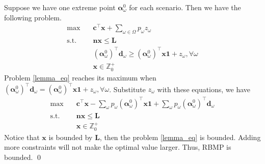   \begin{pf}
    Suppose we have one extreme point $\bm{\alpha}_{\omega}^{0}$ for each scenario. Then we have the following problem.
    \begin{equation}\label{lemma_eq}
      \begin{aligned}
        \max \quad & \mathbf{c}^{\intercal} \mathbf{x} + \sum_{\omega \in \Omega} p_{\omega} z_{\omega} \\
        \text {s.t.} \quad & \mathbf{n} \mathbf{x} \leq \mathbf{L} \\
        & (\bm{\alpha}_{\omega}^{0})^{\intercal}\mathbf{d}_{\omega} \geq (\bm{\alpha}_{\omega}^{0})^{\intercal} \mathbf{x} \mathbf{1} + z_{\omega}, \forall \omega \\
         & \mathbf{x} \in \mathbb{Z}^{+}_{0}
      \end{aligned}
    \end{equation}
    Problem \eqref{lemma_eq} reaches its maximum when $(\bm{\alpha}_{\omega}^{0})^{\intercal}\mathbf{d}_{\omega} = (\bm{\alpha}_{\omega}^{0})^{\intercal} \mathbf{x} \mathbf{1} + z_{\omega}, \forall \omega$. Substitute $z_{\omega}$ with these equations, we have 
    \begin{equation}\label{lemma_eq2}
      \begin{aligned}
        \max \quad & \mathbf{c}^{\intercal} \mathbf{x} - \sum_{\omega}p_{\omega}(\bm{\alpha}_{\omega}^{0})^{\intercal} \mathbf{x} \mathbf{1} + \sum_{\omega} p_{\omega} (\bm{\alpha}_{\omega}^{0})^{\intercal} \mathbf{d}_{\omega} \\
        \text {s.t.} \quad & \mathbf{n} \mathbf{x} \leq \mathbf{L} \\
        & \mathbf{x} \in \mathbb{Z}^{+}_{0}
      \end{aligned}
    \end{equation}
    Notice that $\mathbf{x}$ is bounded by $\mathbf{L}$, then the problem \eqref{lemma_eq} is bounded. Adding more constraints will not make the optimal value larger. Thus, RBMP is bounded. 
    \qed
  \end{pf}




